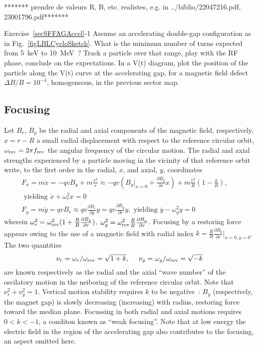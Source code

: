  ******* prendre de valeurs R, B, etc. realistes, e.g. in ../biblio/22047216.pdf, 23001796.pdf*******

\smallskip
\noindent {\small $\bullet$} Exercise~\ref{secSFFAGAccel}-1 
Assume an accelerating double-gap  configuration as in Fig.~\ref{figLBLCycloSketch}. 
What is the minimum number of turns  expected  from 5~keV to 10~MeV~? Track a particle over that range, 
play with the RF phase, conclude on the  expectations. 
In a V(t) diagram, plot  the position  of the particle along the V(t) curve at the 
accelerating gap, for a magnetic field defect 
$\Delta B/B= 10^{-4}$, homogeneous, in the previous sector  map. 




\subsection{Focusing  \label{secSFFAGFocus}}

Let $B_r$, $B_y$  be the radial and axial components of the magnetic field, respectively, 
$x=r-R$ a small radial displacement with respect to the reference circular orbit,  
$\omega_{\rm rev} = 2\pi f_{\rm rev} $ the angular frequency of the circular motion. 
The radial and axial  strengths experienced by a particle moving in the vicinity of that reference orbit 
write, to the first order in the radial, $x$,  and axial, $y$, coordinates 
\begin{eqnarray}
\label{EqCycloFoc}
F_x = m \ddot x=  -qvB_y + m\frac{v^2}{r} \approx -q v (B_y|_{x=0} + \frac{\partial B_y}{\partial r}x)  + m\frac{v^2}{R}(1-\frac{x}{R}), & \nonumber \\ 
\textrm{~yielding~}  \ddot x + \omega_r^2 x=0 &  \nonumber \\
F_y= m\ddot y =   qvB_r \approx q v \frac{\partial B_r}{\partial y} y = q v \frac{\partial B_y}{\partial r} y, 
 \textrm{~yielding~}    \ddot{y} - \omega_y^2 y= 0  & ~ ~ ~ 
\end{eqnarray}
wherein 
$\omega_r^2 = \omega_{\rm rev}^2(1+\frac{R}{B}\frac{\partial B_y}{\partial r})$,  
$ \omega_y^2 = \omega_{\rm rev}^2 \frac{R}{B} \frac{\partial B_y}{\partial r}$. 
Focusing by a restoring force appears owing to the use of a magnetic field with radial 
index $k = \frac{R}{B}\frac{\partial B_y}{\partial r}|_{x=0,y=0}$. 
The two quantities 
\begin{equation}
  \nu_r = \omega_r/\omega_{\rm rev} = \sqrt{1+k},   ~ ~ ~ ~ 
 \nu_y=\omega_y /\omega_{\rm rev}  = \sqrt{-k} 
\end{equation}
are known  respectively as the radial and the axial ``wave number'' of 
the oscilatory motion in the neiboring of the reference circular orbit.
Note that $\nu_r^2 + \nu_y^2=1$.
Vertical motion stability requires $k$ to be negative~:  $B_y$ (respectively, the magnet gap) 
is slowly  decreasing (increasing) with radius, restoring force toward the 
median plane. 
Focussing in both radial and axial motions requires $0 < k <-1$, a conditon known as ``weak focusing''.
 Note that  at low energy  the electric field in the 
region of the accelerating gap also contributes to the focusing, an aspect omitted here. 


